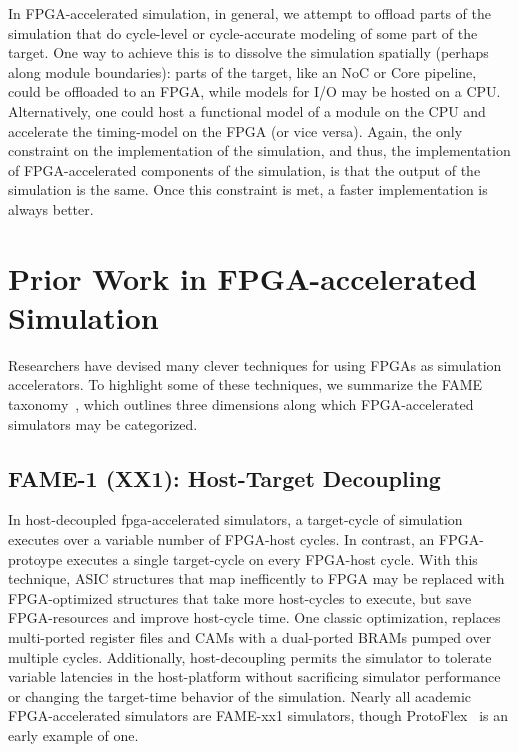 
In FPGA-accelerated simulation, in general, we attempt to offload parts of the
simulation that do cycle-level or cycle-accurate modeling of some part of the
target. One way to achieve this is to dissolve the simulation spatially
(perhaps along module boundaries): parts of the target, like an NoC or Core
pipeline, could be offloaded to an FPGA, while models for I/O may be hosted on
a CPU.  Alternatively, one could host a functional model of a module on the CPU
and accelerate the timing-model on the FPGA (or vice versa).  Again, the only
constraint on the implementation of the simulation, and thus, the
implementation of FPGA-accelerated components of the simulation, is that the
output of the simulation is the same. Once this constraint is met, a faster
implementation is always better.

\section{Prior Work in FPGA-accelerated Simulation}

Researchers have devised many clever techniques for using FPGAs as simulation
accelerators. To highlight some of these techniques, we summarize the FAME
taxonomy~\cite{fame}, which outlines three dimensions along which
FPGA-accelerated simulators may be categorized.

\subsection{FAME-1 (XX1): Host-Target Decoupling}

In host-decoupled fpga-accelerated simulators, a target-cycle of simulation
executes over a variable number of FPGA-host cycles. In contrast, an
FPGA-protoype executes a single target-cycle on every FPGA-host cycle. With
this technique, ASIC structures that map inefficently to FPGA may be replaced
with FPGA-optimized structures that take more host-cycles to execute, but save
FPGA-resources and improve host-cycle time.  One classic optimization, replaces
multi-ported register files and CAMs with a dual-ported BRAMs pumped over
multiple cycles.  Additionally, host-decoupling permits the simulator to
tolerate variable latencies in the host-platform without sacrificing simulator
performance or changing the target-time behavior of the simulation. Nearly all
academic FPGA-accelerated simulators are FAME-xx1 simulators, though
ProtoFlex~\cite{protoflex} is an early example of one.

